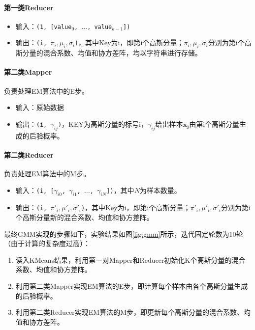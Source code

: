 \documentclass{ML}
\begin{document}
\paragraph{第一类Reducer}
\begin{itemize}
    \item 输入：\texttt{(1, [value$_0$, $\dots$, value$_{k-1}$])}
    \item 输出：\texttt{(i, $\pi_i, \mu_i, \sigma_i$)}，其中Key为i，即第i个高斯分量；$\pi_i, \mu_i, \sigma_i$分别为第i个高斯分量的混合系数、均值和协方差阵，均以字符串进行存储。
\end{itemize}

\paragraph{第二类Mapper} 负责处理EM算法中的E步。
\begin{itemize}
    \item 输入：原始数据
    \item 输出：\texttt{(i, $\gamma_{ij}$)}，KEY为高斯分量的标号i，$\gamma_{ij}$给出样本$\mathbf{x_j}$由第i个高斯分量生成的后验概率\cite{ml-book}。
\end{itemize}

\paragraph{第二类Reducer} 负责处理EM算法中的M步。
\begin{itemize}
    \item 输入：\texttt{(i, [$\gamma_{i0}$, $\gamma_{i1}$, $\dots$, $\gamma_{iN}$])}，其中$N$为样本数量。
    \item 输出：\texttt{(i, $\pi'_i, \mu'_i, \sigma'_i$)}，其中Key为i，即第i个高斯分量；$\pi'_i, \mu'_i, \sigma'_i$分别为第i个高斯分量新的混合系数、均值和协方差阵。
\end{itemize}

最终GMM实现的步骤如下，实验结果如图\ref{fig:gmm}所示，迭代固定轮数为10轮（由于计算的复杂度过高）：
\begin{enumerate}
    \item 读入KMeans结果，利用第一对Mapper和Reducer初始化K个高斯分量的混合系数、均值和协方差阵。
    \item 利用第二类Mapper实现EM算法的E步，即计算每个样本由各个高斯分量生成的后验概率。
    \item 利用第二类Reducer实现EM算法的M步，即更新每个高斯分量的混合系数、均值和协方差阵。
\end{enumerate}
\end{document}
